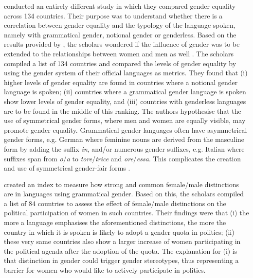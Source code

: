 \textcite{prewitt2012gendering} conducted an entirely different study in which they compared gender equality across 134 countries. Their purpose was to understand whether there is a correlation between gender equality and the typology of the language spoken, namely with grammatical gender, notional gender or genderless. Based on the results provided by \textcite{boroditsky2003sex}, the scholars wondered if the influence of gender was to be extended to the relationships between women and men as well \citep[269]{prewitt2012gendering}. The scholars compiled a list of 134 countries and compared the levels of gender equality by using the gender system of their official languages as metrics. They found that (i) higher levels of gender equality are found in countries where a notional gender language is spoken; (ii) countries where a grammatical gender language is spoken show lower levels of gender equality, and (iii) countries with genderless languages are to be found in the middle of this ranking. The authors hypothesise that the use of symmetrical gender forms, where men and women are equally visible, may promote gender equality. Grammatical gender languages often have asymmetrical gender forms, e.g. German where feminine nouns are derived from the masculine form by adding the suffix \textit{in}, and/or numerous gender suffixes, e.g. Italian where suffixes span from \textit{o}/\textit{a} to \textit{tore}/\textit{trice} and \textit{ore}/\textit{essa}. This complicates the creation and use of symmetrical gender-fair forms \citep[279]{prewitt2012gendering}. 

\textcite{santacreu2013female} created an index to measure how strong and common female/male distinctions are in languages using grammatical gender. Based on this, the scholars compiled a list of 84 countries to assess the effect of female/male distinctions on the political participation of women in such countries. Their findings were that (i) the more a language emphasises the aforementioned distinctions, the more the country in which it is spoken is likely to adopt a gender quota in politics; (ii) these very same countries also show a larger increase of women participating in the political agenda after the adoption of the quota. The explanation for (i) is that distinction in gender could trigger gender stereotypes, thus representing a barrier for women who would like to actively participate in politics. 

